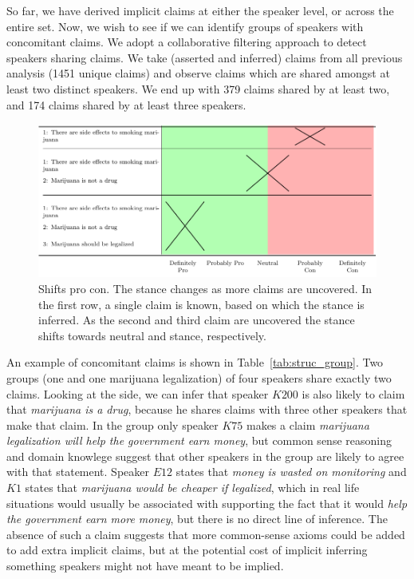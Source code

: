 So far, we have derived implicit claims at either the speaker level, or across
the entire set. Now, we wish to see if we can identify groups of speakers with
concomitant claims. We adopt a collaborative filtering approach
\citep{herlocker1999algorithmic} to detect speakers sharing claims.  We take
(asserted and inferred) claims  from all previous analysis (1451 unique claims)
and observe claims which are shared amongst at least two distinct speakers.
We end up with 379 claims shared by at least two, and 174 claims shared by at least three
speakers. 

\begin{figure}[t]
	\includegraphics{struc_arg_shift-figure0.pdf}
\caption{Shifts pro con. The stance changes as more claims are uncovered. In the first row, 
a single claim is known, based on which the  stance is inferred.
As the second and third claim are uncovered the stance shifts towards neutral and 
 stance, respectively.
}
\label{fig:pro_con_shift}
\end{figure}


An example of concomitant claims is shown in Table~\ref{tab:struc_group}. 
Two groups (one  and one  marijuana legalization)
of four speakers share exactly two claims. Looking at the  side, we
can infer that speaker $K200$ is also likely to claim that \emph{marijuana is a drug}, because
he shares claims with three other speakers that make that claim.
In the  group only speaker $K75$ makes a claim 
\emph{marijuana legalization will help the government earn money}, but
common sense reasoning and domain knowlege suggest that other speakers in the group
are likely to agree with that statement. Speaker $E12$ states 
that \emph{money is wasted on monitoring} and $K1$ states that \emph{
marijuana would be cheaper if legalized}, which in real life situations 
would usually be associated with supporting the fact that it would
\emph{help the government earn more money}, but there is no direct line of inference.
The absence of such a claim suggests that more common-sense axioms could be
added to add extra implicit claims, but at the potential cost of 
implicit inferring something speakers might not have meant to be implied. 

